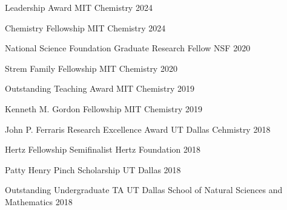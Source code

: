 
\begin{cvhonors}
\cvhonor
  {Leadership Award} %
  {MIT Chemistry} %
  {} %
  {2024} %

\cvhonor
  {Chemistry Fellowship} %
  {MIT Chemistry} %
  {} %
  {2024} %


  \cvhonor
    {National Science Foundation Graduate Research Fellow} %
    {NSF} %
    {} %
    {2020} %
    
    
  \cvhonor
    {Strem Family Fellowship} %
    {MIT Chemistry} %
    {} %
    {2020} %

  \cvhonor
    {Outstanding Teaching Award} %
    {MIT Chemistry} %
    {} %
    {2019} %

  \cvhonor
    {Kenneth M. Gordon Fellowship} %
    {MIT Chemistry} %
    {} %
    {2019} %

  \cvhonor
    {John P. Ferraris Research Excellence Award} %
    {UT Dallas Cehmistry} %
    {} %
    {2018} %


\cvhonor
{Hertz Fellowship Semifinalist} %
{Hertz Foundation} %
{} %
{2018} %


\cvhonor
{Patty Henry Pinch Scholarship} %
{UT Dallas} %
{} %
{2018} %


\cvhonor
{Outstanding Undergraduate TA} %
{UT Dallas School of Natural Sciences and Mathematics} %
{} %
{2018} %


\end{cvhonors}
